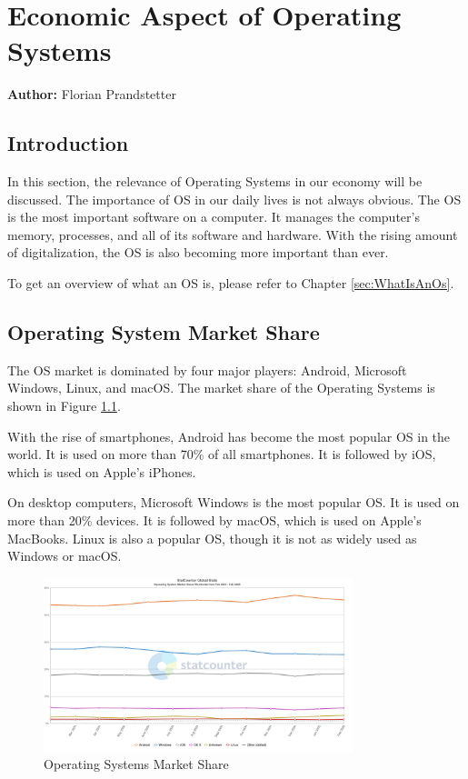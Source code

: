 \chapter{Economic Aspect of Operating Systems}
\label{chap:Economic_aspect_of_Operating_Systems}
\textbf{Author:} Florian Prandstetter

\section{Introduction}

In this section, the relevance of Operating Systems in our economy will be discussed. The importance of OS in our daily lives is not always obvious.
The OS is the most important software on a computer. It manages the computer's memory, processes, and all of its software and hardware. 
With the rising amount of digitalization, the OS is also becoming more important than ever.

To get an overview of what an OS is, please refer to Chapter \ref{sec:WhatIsAnOs}.

\section{Operating System Market Share}

The OS market is dominated by four major players: Android, Microsoft Windows, Linux, and macOS.
The market share of the Operating Systems is shown in Figure \ref{fig:Operating_Systems_Market_Share}. 

With the rise of smartphones, Android has become the most popular OS in the world. It is used on more than 70\% of all smartphones. It is followed by iOS, which is used on Apple's iPhones.

On desktop computers, Microsoft Windows is the most popular OS. It is used on more than 20\% devices. It is followed by macOS, which is used on Apple's MacBooks. Linux is also a popular OS, though it is not as widely used as Windows or macOS.

\begin{figure}[H]
    \centering
    \includegraphics[width=0.8\textwidth]{figures/StatCounter-os_combined-ww-monthly-202402-202502.png}
    \caption{Operating Systems Market Share}
    \label{fig:Operating_Systems_Market_Share}
\end{figure}
\cite{Operating}

